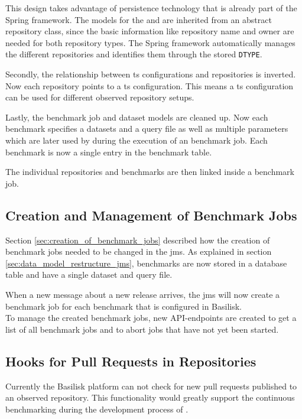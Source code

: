 This design takes advantage of persistence technology that is already part of the Spring framework.
The models for the \gh{} and \dockh{} are inherited from an abstract repository class, since the basic information like repository name and owner are needed for both repository types.
The Spring framework automatically manages the different repositories and identifies them through the stored \texttt{DTYPE}.

Secondly, the relationship between \ac{ts} configurations and repositories is inverted. 
Now each repository points to a \ac{ts} configuration.
This means a \ac{ts} configuration can be used for different observed repository setups.

Lastly, the benchmark job and dataset models are cleaned up.
Now each benchmark specifies a datasets and a query file as well as multiple parameters which are later used by \iguana{} during the execution of an benchmark job.
Each benchmark is now a single entry in the benchmark table.

The individual repositories and benchmarks are then linked inside a benchmark job.


\subsection{Creation and Management of Benchmark Jobs}
\label{sec:creation_of_benchmark_jobs_design}
Section \ref{sec:creation_of_benchmark_jobs} described how the creation of benchmark jobs needed to be changed in the \ac{jms}.
As explained in section \ref{sec:data_model_restructure_jms}, benchmarks are now stored in a database table and have a single dataset and query file.

When a new message about a new release arrives, the \ac{jms} will now create a benchmark job for each benchmark that is configured in Basilisk.
\\

To manage the created benchmark jobs, new API-endpoints are created to get a list of all benchmark jobs and to abort jobs that have not yet been started.


\subsection{Hooks for Pull Requests in \gh{} Repositories}
\label{sec:pullrequests_hcs_design}
Currently the Basilisk platform can not check for new pull requests published to an observed repository.
This functionality would greatly support the continuous benchmarking during the development process of \tsp{}.

